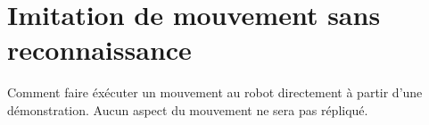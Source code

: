 \section{Imitation de mouvement sans reconnaissance}

Comment faire \'ex\'ecuter un mouvement au robot directement \`a partir
d'une d\'emonstration. Aucun aspect du mouvement ne sera pas
r\'epliqu\'e.
